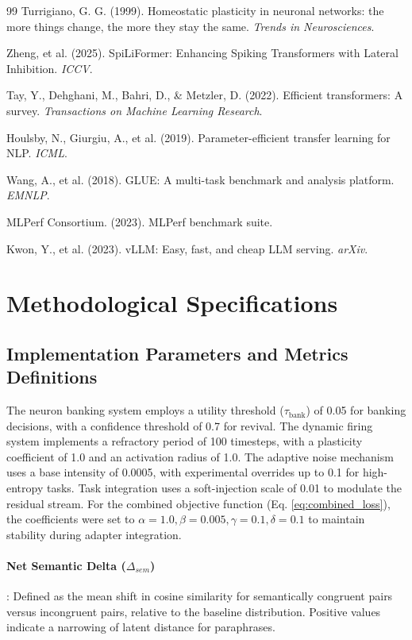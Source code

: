 \documentclass[11pt, letterpaper]{article}
\begin{document}
\begin{thebibliography}{99}
 Turrigiano, G. G. (1999). Homeostatic plasticity in 
neuronal networks: the more things change, the more they stay the same. 
\textit{Trends in Neurosciences}.

 Zheng, et al. (2025). SpiLiFormer: Enhancing Spiking 
Transformers with Lateral Inhibition. \textit{ICCV}.

 Tay, Y., Dehghani, M., Bahri, D., \& Metzler, D. (2022). Efficient transformers: A survey. \textit{Transactions on Machine Learning Research}.

 Houlsby, N., Giurgiu, A., et al. (2019). Parameter-efficient 
transfer learning for NLP. \textit{ICML}.

 Wang, A., et al. (2018). GLUE: A multi-task benchmark and analysis platform. \textit{EMNLP}.

 MLPerf Consortium. (2023). MLPerf benchmark suite.

 Kwon, Y., et al. (2023). vLLM: Easy, fast, and cheap LLM serving. \textit{arXiv}.

\end{thebibliography}

\appendix
\section{Methodological Specifications}
\subsection{Implementation Parameters and Metrics Definitions}
The neuron banking system employs a utility threshold ($\tau_{\text{bank}}$) of 0.05 for banking decisions, with a confidence threshold of 0.7 for revival. The dynamic firing system implements a refractory period of 100 timesteps, with a plasticity coefficient of 1.0 and an activation radius of 1.0. The adaptive noise mechanism uses a base intensity of 0.0005, with experimental overrides up to 0.1 for high-entropy tasks. Task integration uses a soft-injection scale of 0.01 to modulate the residual stream. For the combined objective function (Eq. \ref{eq:combined_loss}), the coefficients were set to $\alpha = 1.0, \beta = 0.005, \gamma = 0.1, \delta = 0.1$ to maintain stability during adapter integration.

\paragraph{Net Semantic Delta ($\Delta_{sem}$)}: Defined as the mean shift in cosine similarity for semantically congruent pairs versus incongruent pairs, relative to the baseline distribution. Positive values indicate a narrowing of latent distance for paraphrases.
\end{document}
